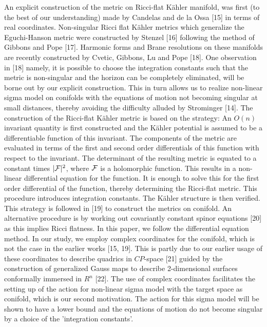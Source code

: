 \documentclass[a4paper,12pt]{article}
\begin{document}
{\vspace{0.5cm}

An explicit construction of the metric on Ricci-flat K\"{a}hler manifold, was
first (to the best of our understanding) made by Candelas and de la Ossa [15]
in terms of real coordinates. Non-singular Ricci flat K\"{a}hler metrics which
generalize the Eguchi-Hanson metric were constructed by Stenzel [16] following
the method of Gibbons and Pope [17]. Harmonic forms and Brane resolutions  
on these manifolds are recently constructed by Cvetic, Gibbons, Lu and
 Pope [18]. 
One observation in [18] namely, it is possible to choose
the integration constants such that the metric is non-singular and the horizon
can be completely eliminated, will be borne out by our explicit construction.
This in turn allows us to realize non-linear sigma model on conifolds with the
equations of motion not becoming singular at small distances, thereby avoiding
the difficulty alluded by Strominger [14]. The construction of the Ricci-flat 
K\"{a}hler metric is based on the strategy: An $O(n)$ invariant quantity  
is first constructed and the K\"{a}hler potential is assumed to be a differentiable function of
this invariant. The components of the metric are evaluated in terms of the 
first and second order differentials of this function with respect to the 
invariant. The determinant of the resulting metric is equated to a constant 
times $|{\cal{F}}|^2$, where ${\cal{F}}$ is a holomorphic function.  
This results in a non-linear differential equation for
the function. It is enough to solve this for the first order differential of 
the function, thereby determining the Ricci-flat metric. 
This procedure introduces integration constants.
The K\"{a}hler 
structure is then verified. This strategy is followed in [19] to construct the
metrics on conifold. An alternative procedure is by working out covariantly
constant spinor equations [20] as this implies Ricci flatness. In this paper,
we follow the differential equation method. In our study, we employ complex
coordinates for the conifold, which is not the case in the earlier works [15,
19]. 
This is partly due to our earlier usage of these
coordinates to describe quadrics in $CP$-space [21] guided by the 
construction of generalized Gauss maps to describe 2-dimensional surfaces
conformally immersed in $R^n$ [22]. The use of complex coordinates facilitates
the setting up of the action for non-linear sigma model with the target space
as conifold, which is our second motivation. The action for this sigma model   
will be shown to have a lower bound and the equations of motion do not 
become singular by a choice of the 'integration constants'.  

}
\end{document}
